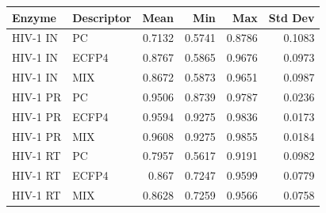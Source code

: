 \begin{tabular}{llrrrr}
\toprule
Enzyme & Descriptor & Mean & Min & Max & Std Dev \\
\midrule
HIV-1 IN & PC & 0.7132 & 0.5741 & 0.8786 & 0.1083 \\
HIV-1 IN & ECFP4 & 0.8767 & 0.5865 & 0.9676 & 0.0973 \\
HIV-1 IN & MIX & 0.8672 & 0.5873 & 0.9651 & 0.0987 \\
HIV-1 PR & PC & 0.9506 & 0.8739 & 0.9787 & 0.0236 \\
HIV-1 PR & ECFP4 & 0.9594 & 0.9275 & 0.9836 & 0.0173 \\
HIV-1 PR & MIX & 0.9608 & 0.9275 & 0.9855 & 0.0184 \\
HIV-1 RT & PC & 0.7957 & 0.5617 & 0.9191 & 0.0982 \\
HIV-1 RT & ECFP4 & 0.867 & 0.7247 & 0.9599 & 0.0779 \\
HIV-1 RT & MIX & 0.8628 & 0.7259 & 0.9566 & 0.0758 \\
\bottomrule
\end{tabular}

